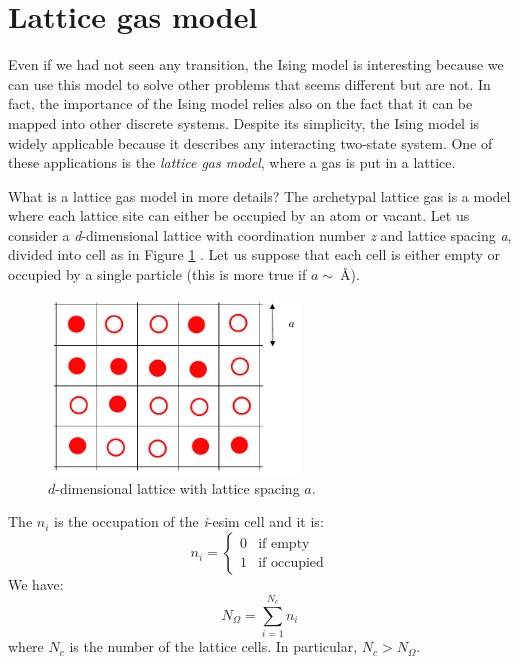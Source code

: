 \documentclass[../main/main.tex]{subfiles}
\begin{document}
\section{Lattice gas model}
Even if we had not seen any transition, the Ising model is interesting because we can use this model to solve other problems that seems different but are not. In fact, the importance of the Ising model relies also on the fact that it can be mapped into other discrete systems. Despite its simplicity, the Ising model is widely applicable because it describes any interacting two-state system. One of these applications is the \emph{lattice gas model}, where a gas is put in a lattice.

 What is a lattice gas model in more details?
 The archetypal lattice gas is a model where each lattice site can either be occupied by an atom or vacant.
 Let us consider a \emph{d}-dimensional lattice with coordination number \emph{z} and lattice spacing \emph{a}, divided into cell as in Figure \ref{fig:6_1} . Let us suppose that each cell is either empty or occupied by a single particle (this is more true if \( a \sim \SI{}{\angstrom}  \)).

 \begin{figure}[h!]
 \centering
 \includegraphics[width=0.6\textwidth]{../lessons/6_image/1.pdf}
 \caption{\label{fig:6_1} \( d \)-dimensional lattice with lattice spacing \( a \).}
 \end{figure}

 \noindent The \( n_i \) is the occupation of the \emph{i}-esim cell and it is:
\begin{equation}
n_i =
  \begin{cases}
   0 & \text{if empty} \\
   1 & \text{if occupied}
  \end{cases}
\end{equation}
We have:
\begin{equation}
  N _ \Omega = \sum_{i=1}^{N_c} n_i
\end{equation}
where \( N_c \) is the number of the lattice cells. In particular, \( N_c > N_{\Omega } \).
\end{document}
